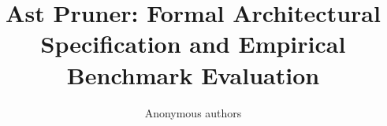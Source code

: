 \title{\textbf{Ast Pruner: Formal Architectural Specification and Empirical Benchmark Evaluation}}

\author{Anonymous authors}

